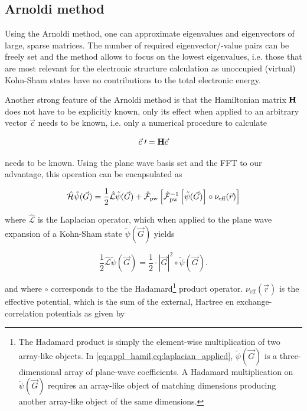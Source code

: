 %
%
%
\subsection{Arnoldi method}

Using the Arnoldi method, one can approximate eigenvalues and eigenvectors of large, sparse matrices. The number of required eigenvector/-value pairs can be freely set and the method allows to focus on the lowest eigenvalues, i.e. those that are most relevant for the electronic structure calculation as unoccupied (virtual) Kohn-Sham states have no contributions to the total electronic energy.

Another strong feature of the Arnoldi method is that the Hamiltonian matrix $\mathbf{H}$ does not have to be explicitly known, only its effect when applied to an arbitrary vector $\vec{c}$ needs to be known, i.e. only a numerical procedure to calculate

\begin{equation}
    \vec{c}\;\prime = \mathbf{H}\vec{c}
\end{equation}

needs to be known. Using the plane wave basis set and the FFT to our advantage, this operation can be encapsulated as

\begin{equation}
    \hat{\mathcal{H}}\tilde{\psi}(\vec{G}) = \frac{1}{2} \hat{\mathcal{L}}\tilde{\psi}(\vec{G}) + \hat{\mathcal{F}}_{\text{pw}}\left[\hat{\mathcal{F}}_{\text{pw}}^{-1}\left[\tilde{\psi}(\vec{G}) \right] \circ \nu_{\text{eff}}(\vec{r}) \right]
    \label{eq:appl_hamil}
\end{equation}

where $\hat{\mathcal{L}}$ is the Laplacian operator, which when applied to the plane wave expansion of a Kohn-Sham state $\tilde{\psi}(\vec{G})$ yields

\begin{equation}
    \frac{1}{2} \hat{\mathcal{L}}\tilde{\psi}(\vec{G}) = \frac{1}{2} \cdot |\vec{G}|^{2} \circ \tilde{\psi}(\vec{G}).
    \label{eq:laplacian_applied}
\end{equation}

and where $\circ$ corresponds to the the Hadamard\footnote{The Hadamard product is simply the element-wise multiplication of two array-like objects. In \cref{eq:appl_hamil,eq:laplacian_applied}, $\tilde{\psi}(\vec{G})$ is a three-dimensional array of plane-wave coefficients. A Hadamard multiplication on $\tilde{\psi}(\vec{G})$ requires an array-like object of matching dimensions producing another array-like object of the same dimensions.} product operator. $\nu_{\text{eff}}(\vec{r})$ is the effective potential, which is the sum of the external, Hartree en exchange-correlation potentials as given by


